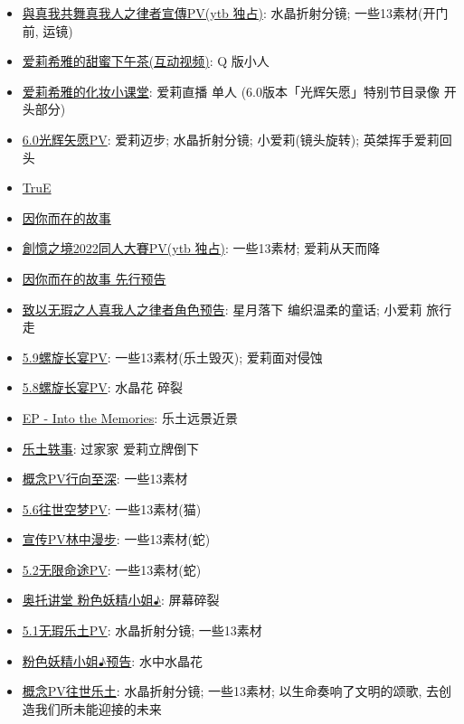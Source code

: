 \documentclass[a4paper]{article}
\begin{document}
\begin{itemize}
    \item \href{https://www.youtube.com/watch?v=mj-lnw1XlN0}{與真我共舞真我人之律者宣傳PV(ytb 独占)}: 水晶折射分镜; 一些13素材(开门前, 运镜)
    \item \href{https://www.bilibili.com/video/BV1Ta411Z7KE/}{爱莉希雅的甜蜜下午茶(互动视频)}: Q 版小人
    \item \href{https://www.bilibili.com/video/BV12T411w7CN/}{爱莉希雅的化妆小课堂}: 爱莉直播 单人 (6.0版本「光辉矢愿」特别节目录像 开头部分)
    \item \href{https://www.bilibili.com/video/BV1Mg411k7U5/}{6.0光辉矢愿PV}: 爱莉迈步; 水晶折射分镜; 小爱莉(镜头旋转); 英桀挥手爱莉回头
    \item \href{https://www.bilibili.com/video/BV1sg411y7cZ/}{TruE}
    \item \href{https://www.bilibili.com/video/BV1fY4y1F7GL/}{因你而在的故事}
    \item \href{https://www.youtube.com/watch?v=psC2zgpPuPQ}{創憶之境2022同人大賽PV(ytb 独占)}: 一些13素材; 爱莉从天而降
    \item \href{https://www.bilibili.com/video/BV1Ee4y1D7ci/}{因你而在的故事 先行预告}
    \item \href{https://www.bilibili.com/video/BV1DS4y1t7rs/}{致以无瑕之人真我人之律者角色预告}: 星月落下 编织温柔的童话; 小爱莉 旅行 走
    \item \href{https://www.bilibili.com/video/BV1Ra411X7Hr/}{5.9螺旋长宴PV}: 一些13素材(乐土毁灭); 爱莉面对侵蚀
    \item \href{https://www.bilibili.com/video/BV1sP4y1F7iQ/}{5.8螺旋长宴PV}: 水晶花 碎裂
    \item \href{https://www.bilibili.com/video/BV18Y4y1Y7Hc/}{EP - Into the Memories}: 乐土远景近景
    \item \href{https://www.bilibili.com/video/BV1fr4y1n787/}{乐土轶事}: 过家家 爱莉立牌倒下
    \item \href{https://www.bilibili.com/video/BV1wF411b7wo/}{概念PV行向至深}: 一些13素材
    \item \href{https://www.bilibili.com/video/BV1KL4y137Jb/}{5.6往世空梦PV}: 一些13素材(猫)
    \item \href{https://www.bilibili.com/video/BV1F341127NT/}{宣传PV林中漫步}: 一些13素材(蛇)
    \item \href{https://www.bilibili.com/video/BV1V44y1b7cf/}{5.2无限命途PV}: 一些13素材(蛇)
    \item \href{https://www.bilibili.com/video/BV1Ny4y1573D/}{奥托讲堂 粉色妖精小姐♪}: 屏幕碎裂
    \item \href{https://www.bilibili.com/video/BV1iP4y1W7Kk/}{5.1无瑕乐土PV}: 水晶折射分镜; 一些13素材
    \item \href{https://www.bilibili.com/video/BV1Nw411R7bU/}{粉色妖精小姐♪预告}: 水中水晶花
    \item \href{https://www.bilibili.com/video/BV1T64y1X7mY/}{概念PV往世乐土}: 水晶折射分镜; 一些13素材; 以生命奏响了文明的颂歌, 去创造我们所未能迎接的未来
\end{itemize}
\end{document}
